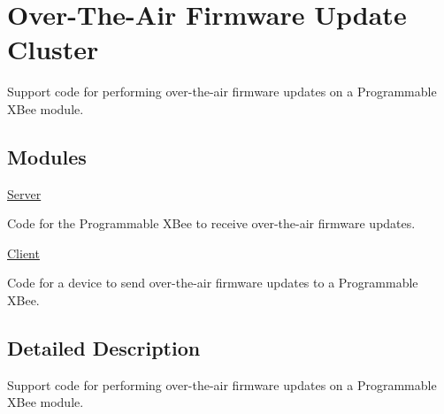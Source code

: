 \hypertarget{group__xbee__ota}{}\section{Over-\/\+The-\/\+Air Firmware Update Cluster}
\label{group__xbee__ota}


\begin{DoxyVerb}  Support code for performing over-the-air firmware updates on a
  Programmable XBee module.\end{DoxyVerb}
  


\subsection*{Modules}
\begin{DoxyCompactItemize}
\item 
\hyperlink{group__xbee__ota__server}{Server}
\begin{DoxyCompactList}\small\item\em \begin{DoxyVerb}     Code for the Programmable XBee to receive over-the-air firmware
     updates.\end{DoxyVerb}
 \end{DoxyCompactList}\item 
\hyperlink{group__xbee__ota__client}{Client}
\begin{DoxyCompactList}\small\item\em \begin{DoxyVerb}     Code for a device to send over-the-air firmware updates to a
     Programmable XBee.\end{DoxyVerb}
 \end{DoxyCompactList}\end{DoxyCompactItemize}


\subsection{Detailed Description}
\begin{DoxyVerb}  Support code for performing over-the-air firmware updates on a
  Programmable XBee module.\end{DoxyVerb}
 

